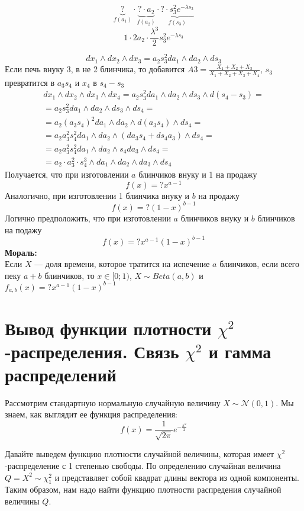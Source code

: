 \documentclass[12pt]{article} %
\theoremstyle{definition} %
\def \cN{\mathcal{N}}
\def \cChi{\mathcal{\chi}}
\begin{document}
    \[
       \underbrace{?}_{f(a_1)}  \cdot  \underbrace{? \cdot a_2}_{f(a_2)} \cdot  \underbrace{? \cdot s_3^2 e^{- \lambda s_3}}_{f(s_3)}
    \]
    \[
        1 \cdot 2a_2 \cdot \frac{\lambda^3}{2} s_3^2 e^{- \lambda s_3}
    \]

    \[
        dx_1 \wedge dx_2 \wedge dx_3 = a_2 s_3^2 da_1 \wedge da_2 \wedge ds_3
    \]
    Если печь внуку 3, в не 2 блинчика, то добавится $A3 = \frac{X_1 + X_2 + X_3}{X_1 + X_2 + X_3 + X_4}$,
     $s_3$ превратится в $a_3 s_4$ и $x_4$ в $s_4 - s_3$
    \begin{eqnarray*}
        dx_1 \wedge dx_2 \wedge dx_3 \wedge dx_4 = a_2 s_3^2 da_1 \wedge da_2 \wedge ds_3 \wedge d(s_4 - s_3) = \\
        = a_2 s_3^2 da_1 \wedge da_2 \wedge ds_3 \wedge ds_4 = \\
        = a_2(a_3 s_4)^2 da_1 \wedge da_2 \wedge d(a_3 s_4) \wedge ds_4 = \\
        = a_2 a_3^2 s_4^2 da_1 \wedge da_2 \wedge (da_3 s_4 + ds_4 a_3) \wedge ds_4 = \\
        = a_2 a_3^2 s_4^2 da_1 \wedge da_2 \wedge s_4 da_3 \wedge ds_4 = \\
        = a_2 \cdot a_3^2 \cdot s_4^3 \wedge da_1 \wedge da_2 \wedge da_3 \wedge ds_4
    \end{eqnarray*}
    Получается, что при изготовлении $a$ блинчиков внуку и 1 на продажу
    \[
        f(x) = ? x^{a-1}
    \]
    Аналогично, при изготовлении 1 блинчика внуку и $b$ на продажу
    \[
        f(x) = ? (1 - x)^{b-1}
    \]
    Логично предположить, что при изготовлении $a$ блинчиков внуку и $b$ блинчиков на подажу
    \[
        f(x) = ? x^{a-1} (1 - x)^{b-1}
    \]
    \textbf{Мораль:}\\
    Если $X$ --- доля времени, которое тратится на испечение $a$ блинчиков, если всего пеку $a + b$ блинчиков, то $x \in [0;1)$, $X \sim Beta(a, b)$ и $f_{a,b}(x) = ? x^{a-1} (1 - x)^{b-1}$


    \section{Вывод функции плотности $\cChi^2$-распределения. Связь
    $\cChi^2$ и гамма распределений}

Рассмотрим стандартную нормальную случайную величину $X \sim \cN(0, 1)$. Мы знаем, как выглядит ее функция распределения:
    \[
        f(x)=\frac{1}{\sqrt{2\pi}}e^{-\frac{x^2}{2}}
    \]

Давайте выведем функцию плотности случайной величины, которая имеет $\chi^2$-распределение с 1 степенью свободы.
По определению случайная величина $Q=X^2 \sim \cChi_1^2$ и представляет собой квадрат длины вектора из одной компоненты. Таким образом, нам надо найти функцию плотности распредения случайной величины $Q$.
\end{document}
